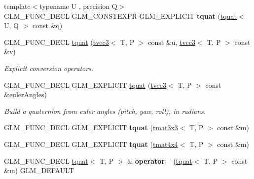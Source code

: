 \begin{DoxyCompactItemize}
\item 
\mbox{\label{structglm_1_1tquat_ad431b0f391ccc1e5d89f12306dc00114}} 
{\footnotesize template$<$typename U , precision Q$>$ }\\G\+L\+M\+\_\+\+F\+U\+N\+C\+\_\+\+D\+E\+CL G\+L\+M\+\_\+\+C\+O\+N\+S\+T\+E\+X\+PR G\+L\+M\+\_\+\+E\+X\+P\+L\+I\+C\+IT {\bfseries tquat} (\hyperlink{structglm_1_1tquat}{tquat}$<$ U, Q $>$ const \&q)
\item 
G\+L\+M\+\_\+\+F\+U\+N\+C\+\_\+\+D\+E\+CL \hyperlink{structglm_1_1tquat_a5c680cd9a6e7de9e5b0fc2e9e096e6a7}{tquat} (\hyperlink{structglm_1_1tvec3}{tvec3}$<$ T, P $>$ const \&u, \hyperlink{structglm_1_1tvec3}{tvec3}$<$ T, P $>$ const \&v)
\begin{DoxyCompactList}\small\item\em Explicit conversion operators. \end{DoxyCompactList}\item 
\mbox{\label{structglm_1_1tquat_a9841cfe16ccfb909c4c2cd0956f2d42b}} 
G\+L\+M\+\_\+\+F\+U\+N\+C\+\_\+\+D\+E\+CL G\+L\+M\+\_\+\+E\+X\+P\+L\+I\+C\+IT \hyperlink{structglm_1_1tquat_a9841cfe16ccfb909c4c2cd0956f2d42b}{tquat} (\hyperlink{structglm_1_1tvec3}{tvec3}$<$ T, P $>$ const \&euler\+Angles)
\begin{DoxyCompactList}\small\item\em Build a quaternion from euler angles (pitch, yaw, roll), in radians. \end{DoxyCompactList}\item 
\mbox{\label{structglm_1_1tquat_a56ea9f0ac327fc40f99821fd8e0816f8}} 
G\+L\+M\+\_\+\+F\+U\+N\+C\+\_\+\+D\+E\+CL G\+L\+M\+\_\+\+E\+X\+P\+L\+I\+C\+IT {\bfseries tquat} (\hyperlink{structglm_1_1tmat3x3}{tmat3x3}$<$ T, P $>$ const \&m)
\item 
\mbox{\label{structglm_1_1tquat_a738e6d5bcc5a75cca8ac119edafaeafa}} 
G\+L\+M\+\_\+\+F\+U\+N\+C\+\_\+\+D\+E\+CL G\+L\+M\+\_\+\+E\+X\+P\+L\+I\+C\+IT {\bfseries tquat} (\hyperlink{structglm_1_1tmat4x4}{tmat4x4}$<$ T, P $>$ const \&m)
\item 
\mbox{\label{structglm_1_1tquat_a19b252f704a5d0cb43df15cd3a8b545e}} 
G\+L\+M\+\_\+\+F\+U\+N\+C\+\_\+\+D\+E\+CL \hyperlink{structglm_1_1tquat}{tquat}$<$ T, P $>$ \& {\bfseries operator=} (\hyperlink{structglm_1_1tquat}{tquat}$<$ T, P $>$ const \&m) G\+L\+M\+\_\+\+D\+E\+F\+A\+U\+LT

\end{DoxyCompactItemize}
